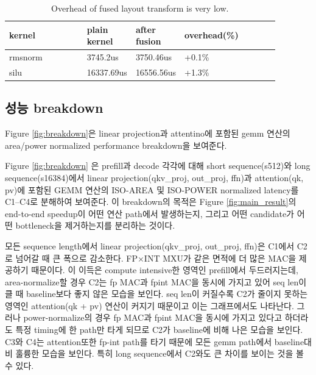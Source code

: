 \documentclass[11pt]{article}
\begin{document}
\begin{table}[H]
\centering
\caption{Overhead of fused layout transform is very low.}
\label{tab:layout-transform-overhead}
\begin{tabular}{p{0.32\linewidth}p{0.14\linewidth}p{0.14\linewidth}p{0.14\linewidth}p{0.14\linewidth}}
\toprule
kernel & plain kernel & after fusion & overhead(\%) \\
\midrule
rmsnorm &  {3745.2us} & {3750.46us} & {+0.1\%}\\
silu &  {16337.69us} & {16556.56us} & {+1.3\%}\\

\bottomrule
\end{tabular}
\end{table}

\subsection{성능 breakdown}

Figure \ref{fig:breakdown}은 linear projection과 attentino에 포함된 gemm 연산의 area/power normalized performance breakdown을 보여준다.

Figure \ref{fig:breakdown} 은 prefill과 decode 각각에 대해 short sequence(s512)와 long sequence(s16384)에서 linear projection(qkv\_proj, out\_proj, ffn)과 attention(qk, pv)에 포함된 GEMM 연산의 ISO-AREA 및 ISO-POWER normalized latency를 C1–C4로 분해하여 보여준다. 이 breakdown의 목적은 Figure \ref{fig:main_result}의 end-to-end speedup이 어떤 연산 path에서 발생하는지, 그리고 어떤 candidate가 어떤 bottleneck을 제거하는지를 분리하는 것이다.

모든 sequence length에서 linear projection(qkv\_proj, out\_proj, ffn)은 C1에서 C2로 넘어갈 때 큰 폭으로 감소한다. FP×INT MXU가 같은 면적에 더 많은 MAC을 제공하기 때문이다. 이 이득은 compute intensive한 영역인 prefill에서 두드러지는데, area-normalize할 경우 C2는 fp MAC과 fpint MAC을 동시에 가지고 있어 seq len이 클 때 baseline보다 좋지 않은 모습을 보인다. seq len이 커질수록 C2가 줄이지 못하는 영역인 attention(qk + pv) 연산이 커지기 때문이고 이는 그래프에서도 나타난다. 그러나 power-normalize의 경우 fp MAC과 fpint MAC을 동시에 가지고 있다고 하더라도 특정 timing에 한 path만 타게 되므로 C2가 baseline에 비해 나은 모습을 보인다. C3와 C4는 attention또한 fp-int path를 타기 때문에 모든 gemm path에서 baseline대비 훌륭한 모습을 보인다. 특히 long sequence에서 C2와도 큰 차이를 보이는 것을 볼 수 있다. 
\end{document}
